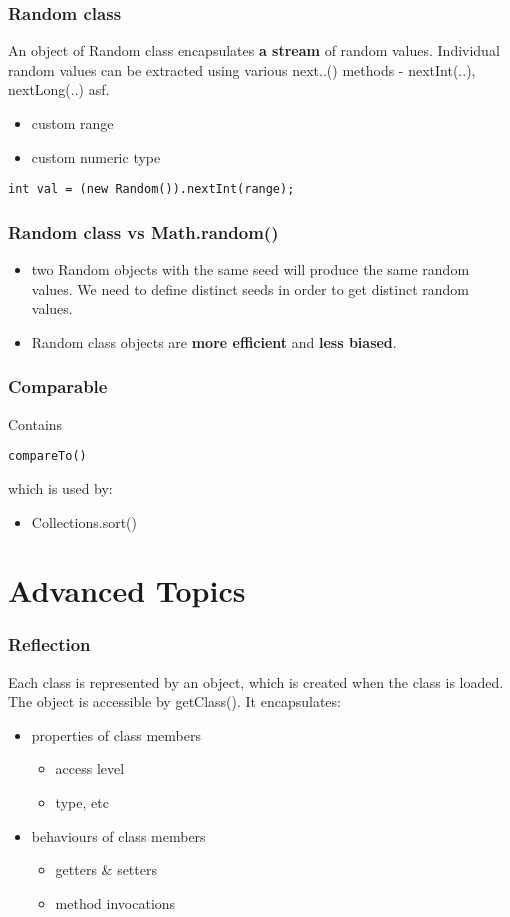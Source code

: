 \documentclass{report}
\begin{document}
\section{Random class}
An object of Random class encapsulates \textbf{a stream} of random values. Individual random values 
can be extracted using various next..() methods - nextInt(..), nextLong(..) asf.
\begin{itemize}
	\item custom range
	\item custom numeric type
\end{itemize}

\begin{verbatim}
int val = (new Random()).nextInt(range);
\end{verbatim}

\section{Random class vs Math.random()}
\begin{itemize}
	\item two Random objects with the same seed will produce the same random values. We need to define distinct seeds
	in order to get distinct random values.
	\item Random class objects are \textbf{more efficient} and \textbf{less biased}.
\end{itemize}

\section{Comparable}
Contains
\begin{verbatim}
compareTo()
\end{verbatim}
which is used by:
\begin{itemize}
	\item Collections.sort()
\end{itemize}

\part{Advanced Topics}
\section{Reflection}
Each class is represented by an object, which is created when the class is loaded. The object is accessible by getClass(). It encapsulates:
\begin{itemize}
	\item properties of class members
	\begin{itemize}
		\item access level
		\item type, etc
	\end{itemize}
	\item behaviours of class members
	\begin{itemize}
		\item getters \& setters
		\item method invocations
	\end{itemize}
\end{itemize}
\end{document}
